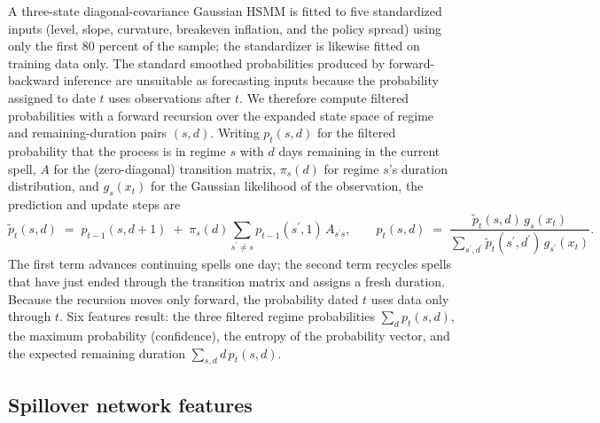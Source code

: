 \documentclass[10pt]{article}
\begin{document}
A three-state diagonal-covariance Gaussian HSMM is fitted to five standardized inputs (level, slope, curvature, breakeven inflation, and the policy spread) using only the first 80 percent of the sample; the standardizer is likewise fitted on training data only. The standard smoothed probabilities produced by forward-backward inference are unsuitable as forecasting inputs because the probability assigned to date $t$ uses observations after $t$. We therefore compute filtered probabilities with a forward recursion over the expanded state space of regime and remaining-duration pairs $(s, d)$. Writing $p_t(s,d)$ for the filtered probability that the process is in regime $s$ with $d$ days remaining in the current spell, $A$ for the (zero-diagonal) transition matrix, $\pi_s(d)$ for regime $s$'s duration distribution, and $g_s(x_t)$ for the Gaussian likelihood of the observation, the prediction and update steps are
\begin{equation}
\tilde{p}_t(s,d) \;=\; p_{t-1}(s, d+1) \;+\; \pi_s(d)\sum_{s^{\prime} \neq s} p_{t-1}(s^{\prime}, 1)\, A_{s^{\prime} s},
\qquad
p_t(s,d) \;=\; \frac{\tilde{p}_t(s,d)\, g_s(x_t)}{\sum_{s^{\prime}, d^{\prime}} \tilde{p}_t(s^{\prime},d^{\prime})\, g_{s^{\prime}}(x_t)} .
\label{eq:filter}
\end{equation}
The first term advances continuing spells one day; the second term recycles spells that have just ended through the transition matrix and assigns a fresh duration. Because the recursion moves only forward, the probability dated $t$ uses data only through $t$. Six features result: the three filtered regime probabilities $\sum_d p_t(s,d)$, the maximum probability (confidence), the entropy of the probability vector, and the expected remaining duration $\sum_{s,d} d \, p_t(s,d)$.

\subsection{Spillover network features}
\end{document}
